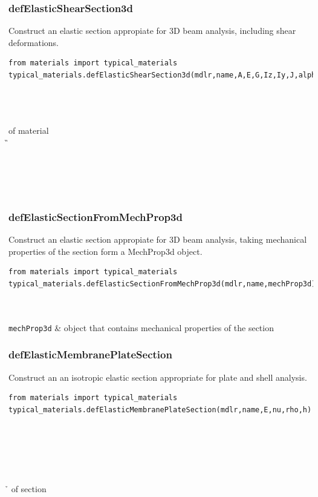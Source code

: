\subsubsection{defElasticShearSection3d}
\noindent Construct an elastic section appropiate for 3D beam analysis, including shear deformations.
\begin{verbatim}
from materials import typical_materials
typical_materials.defElasticShearSection3d(mdlr,name,A,E,G,Iz,Iy,J,alpha)
\end{verbatim}
\begin{paramFuncTable}
\mdlr{} \\
 \\
\A{} \\
\E of material \\
\G{} \\
\Iz{} \\
\Iy{} \\
\J{} \\
\alphaX{} \\
\end{paramFuncTable}

\subsubsection{defElasticSectionFromMechProp3d}
\noindent Construct an elastic section appropiate for 3D beam analysis, taking mechanical properties of the section form a MechProp3d object.
\begin{verbatim}
from materials import typical_materials
typical_materials.defElasticSectionFromMechProp3d(mdlr,name,mechProp3d)
\end{verbatim}
\begin{paramFuncTable}
\mdlr{} \\
 \\
{\tt mechProp3d} & object that contains mechanical properties of the section  \\
\end{paramFuncTable}


\subsubsection{defElasticMembranePlateSection}
\noindent Construct an an isotropic elastic section appropriate for plate and shell analysis.
\begin{verbatim}
from materials import typical_materials
typical_materials.defElasticMembranePlateSection(mdlr,name,E,nu,rho,h)
\end{verbatim}
\begin{paramFuncTable}
\mdlr{} \\
\\
\E{} \\
\nuX{} \\
\rhoX{} \\
\h{} of section\\
\end{paramFuncTable}

